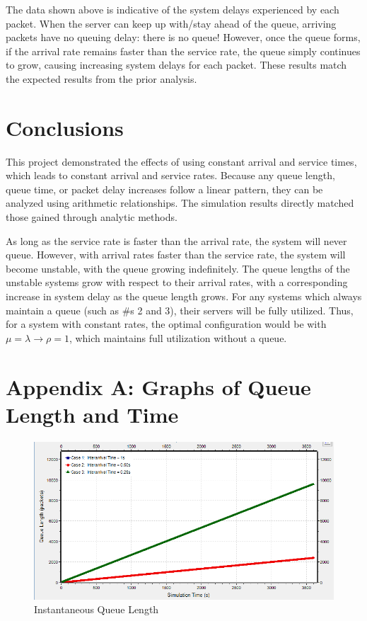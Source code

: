 \documentclass{article}
\begin{document}
The data shown above is indicative of the system delays experienced by each packet.
When the server can keep up with/stay ahead of the queue, arriving packets have no queuing delay:  there is no queue!
However, once the queue forms, if the arrival rate remains faster than the service rate, the queue simply continues to grow, causing increasing system delays for each packet.
These results match the expected results from the prior analysis.

\section*{Conclusions}
This project demonstrated the effects of using constant arrival and service times, which leads to constant arrival and service rates.
Because any queue length, queue time, or packet delay increases follow a linear pattern, they can be analyzed using arithmetic relationships. 
The simulation results directly matched those gained through analytic methods.

As long as the service rate is faster than the arrival rate, the system will never queue.
However, with arrival rates faster than the service rate, the system will become unstable, with the queue growing indefinitely.
The queue lengths of the unstable systems grow with respect to their arrival rates, with a corresponding increase in system delay as the queue length grows.
For any systems which always maintain a queue (such as \#s 2 and 3), their servers will be fully utilized.
Thus, for a system with constant rates, the optimal configuration would be with $\mu = \lambda \rightarrow \rho = 1$, which maintains full utilization without a queue.

\newpage
\section*{Appendix A:  Graphs of Queue Length and Time}
\begin{figure}[h!]
	\begin{center}
	\includegraphics[scale=0.65]{Images/QLen.PNG}
	\vspace{-.25cm}
	\caption{Instantaneous Queue Length}
	\label{fig:qlen}
	\end{center}
\end{figure}
\end{document}
